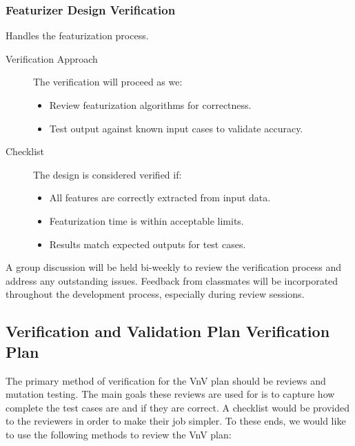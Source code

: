 \documentclass[12pt, titlepage]{article}
\begin{document}
\subsubsection{Featurizer Design Verification}
Handles the featurization process.
\begin{description}
  \item[Verification Approach] The verification will proceed as we:
  \begin{itemize}[leftmargin=0cm]
    \item Review featurization algorithms for correctness.
    \item Test output against known input cases to validate accuracy.
  \end{itemize}
  \item[Checklist] The design is considered verified if:
    \begin{itemize}[label=$\square$,leftmargin=0cm]
    \item All features are correctly extracted from input data.
    \item Featurization time is within acceptable limits.
    \item Results match expected outputs for test cases.
  \end{itemize}
\end{description}

A group discussion will be held bi-weekly to review the verification process and address any outstanding issues. Feedback from classmates will be incorporated throughout the development process, especially during review sessions.

\subsection{Verification and Validation Plan Verification Plan}


The primary method of verification for the VnV plan should be reviews and mutation testing. The main goals these reviews 
are used for is to capture how complete the test cases are and if they are correct. A checklist would be provided
to the reviewers in order to make their job simpler. To these ends, we would like to use 
the following methods to review the VnV plan: 
\end{document}
